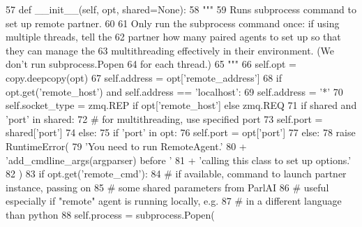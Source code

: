 \begin{DoxyCode}
57     \textcolor{keyword}{def }\_\_init\_\_(self, opt, shared=None):
58         \textcolor{stringliteral}{"""}
59 \textcolor{stringliteral}{        Runs subprocess command to set up remote partner.}
60 \textcolor{stringliteral}{}
61 \textcolor{stringliteral}{        Only run the subprocess command once: if using multiple threads, tell the}
62 \textcolor{stringliteral}{        partner how many paired agents to set up so that they can manage the}
63 \textcolor{stringliteral}{        multithreading effectively in their environment. (We don't run subprocess.Popen}
64 \textcolor{stringliteral}{        for each thread.)}
65 \textcolor{stringliteral}{        """}
66         self.opt = copy.deepcopy(opt)
67         self.address = opt[\textcolor{stringliteral}{'remote\_address'}]
68         \textcolor{keywordflow}{if} opt.get(\textcolor{stringliteral}{'remote\_host'}) \textcolor{keywordflow}{and} self.address == \textcolor{stringliteral}{'localhost'}:
69             self.address = \textcolor{stringliteral}{'*'}
70         self.socket\_type = zmq.REP \textcolor{keywordflow}{if} opt[\textcolor{stringliteral}{'remote\_host'}] \textcolor{keywordflow}{else} zmq.REQ
71         \textcolor{keywordflow}{if} shared \textcolor{keywordflow}{and} \textcolor{stringliteral}{'port'} \textcolor{keywordflow}{in} shared:
72             \textcolor{comment}{# for multithreading, use specified port}
73             self.port = shared[\textcolor{stringliteral}{'port'}]
74         \textcolor{keywordflow}{else}:
75             \textcolor{keywordflow}{if} \textcolor{stringliteral}{'port'} \textcolor{keywordflow}{in} opt:
76                 self.port = opt[\textcolor{stringliteral}{'port'}]
77             \textcolor{keywordflow}{else}:
78                 \textcolor{keywordflow}{raise} RuntimeError(
79                     \textcolor{stringliteral}{'You need to run RemoteAgent.'}
80                     + \textcolor{stringliteral}{'add\_cmdline\_args(argparser) before '}
81                     + \textcolor{stringliteral}{'calling this class to set up options.'}
82                 )
83             \textcolor{keywordflow}{if} opt.get(\textcolor{stringliteral}{'remote\_cmd'}):
84                 \textcolor{comment}{# if available, command to launch partner instance, passing on}
85                 \textcolor{comment}{# some shared parameters from ParlAI}
86                 \textcolor{comment}{# useful especially if "remote" agent is running locally, e.g.}
87                 \textcolor{comment}{# in a different language than python}
88                 self.process = subprocess.Popen(

\end{DoxyCode}
